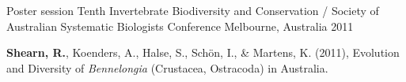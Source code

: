 \begin{cventries}
	\cventry
	{Poster session} %
	{Tenth Invertebrate Biodiversity and Conservation / Society of Australian Systematic Biologists Conference} %
	{Melbourne, Australia} %
	{2011} %
	{
		\begin{cvitems} %
			\item {\textbf{Shearn, R.}, Koenders, A., Halse, S., Schön, I., \& Martens, K. (2011), Evolution and Diversity of \textit{Bennelongia} (Crustacea, Ostracoda) in Australia.}
		\end{cvitems}
	}
	
\end{cventries}